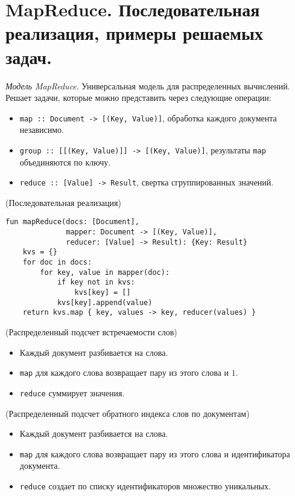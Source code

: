 \section{MapReduce. Последовательная реализация, примеры решаемых задач.}

\begin{definition}
    \textit{Модель MapReduce}. Универсальная модель для распределенных
    вычислений. Решает задачи, которые можно представить через следующие
    операции:
    \begin{itemize}
      \item \texttt{map :: Document -> [(Key, Value)]}, обработка каждого
        документа независимо.
      \item \texttt{group :: [[(Key, Value)]] -> [(Key, Value)]},
        результаты \texttt{map} объединяются по ключу.
      \item \texttt{reduce :: [Value] -> Result}, свертка сгруппированных
        значений.
    \end{itemize}
\end{definition}

\begin{algorithm}(Последовательная реализация)
  \begin{lstlisting}
fun mapReduce(docs: [Document],
              mapper: Document -> [(Key, Value)],
              reducer: [Value] -> Result): {Key: Result}
    kvs = {}
    for doc in docs:
        for key, value in mapper(doc):
            if key not in kvs:
                kvs[key] = []
            kvs[key].append(value)
    return kvs.map { key, values -> key, reducer(values) }
  \end{lstlisting}
\end{algorithm}

\begin{example}(Распределенный подсчет встречаемости слов)
  \begin{itemize}
    \item Каждый документ разбивается на слова.
    \item \texttt{map} для каждого слова возвращает пару из этого слова и $1$.
    \item \texttt{reduce} суммирует значения.
  \end{itemize}
\end{example}

\begin{example}(Распределенный подсчет обратного индекса слов по документам)
  \begin{itemize}
    \item Каждый документ разбивается на слова.
    \item \texttt{map} для каждого слова возвращает пару из этого слова и
      идентификатора документа.
    \item \texttt{reduce} создает по списку идентификаторов множество
      уникальных.
  \end{itemize}
\end{example}
